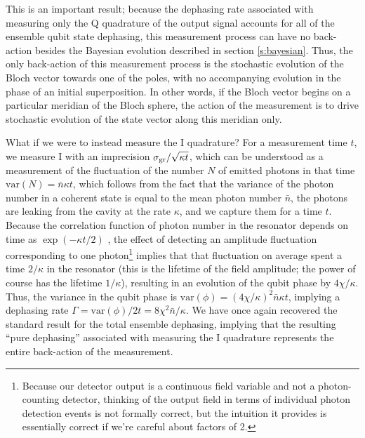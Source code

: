 This is an important result; because the dephasing rate associated with measuring only the Q quadrature of the output signal accounts for all of the ensemble qubit state dephasing, this measurement process can have no back-action besides the Bayesian evolution described in section \ref{s:bayesian}.  Thus, the only back-action of this measurement process is the stochastic evolution of the Bloch vector towards one of the poles, with no accompanying evolution in the phase of an initial superposition.  In other words, if the Bloch vector begins on a particular meridian of the Bloch sphere, the action of the measurement is to drive stochastic evolution of the state vector along this meridian only.

What if we were to instead measure the I quadrature?  For a measurement time $t$, we measure I with an imprecision $\sigma_{\rm gr} / \sqrt{\kappa t}$, which can be understood as a measurement of the fluctuation of the number $N$ of emitted photons in that time $\mathrm{var}(N) = \bar{n}\kappa t$, which follows from the fact that the variance of the photon number in a coherent state is equal to the mean photon number $\bar{n}$, the photons are leaking from the cavity at the rate $\kappa$, and we capture them for a time $t$.  Because the correlation function of photon number in the resonator depends on time as $\exp(-\kappa t/2)$ \cite{clerk_revmod}, the effect of detecting an amplitude fluctuation corresponding to one photon\footnote{Because our detector output is a continuous field variable and not a photon-counting detector, thinking of the output field in terms of individual photon detection events is not formally correct, but the intuition it provides is essentially correct if we're careful about factors of 2.} implies that that fluctuation on average spent a time $2/\kappa$ in the resonator (this is the lifetime of the field amplitude; the power of course has the lifetime $1/\kappa$), resulting in an evolution of the qubit phase by $4\chi/\kappa$.  Thus, the variance in the qubit phase is $\mathrm{var}(\phi) = (4 \chi/\kappa)^2 \bar{n}\kappa t$, implying a dephasing rate $\Gamma = \mathrm{var}(\phi) / 2 t = 8\chi^2 \bar{n} / \kappa$.  We have once again recovered the standard result for the total ensemble dephasing, implying that the resulting ``pure dephasing'' associated with measuring the I quadrature represents the entire back-action of the measurement.


